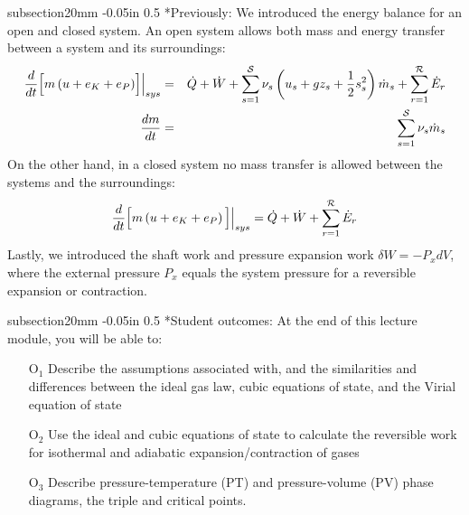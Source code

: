 \documentclass[11pt]{article}
\makeatletter
\theoremstyle{definition}
\renewcommand\subsection{\@startsection
	{subsection}{2}{0mm}
	{-0.05in}
	{0.5\baselineskip}
	{\normalfont\normalsize\bfseries}}
\makeatother
\begin{document}
\begin{mdframed}[backgroundcolor=lgray]
\subsection*{Previously:}
\noindent We introduced the energy balance for an open and closed system.
An open system allows both mass and energy transfer between a system and its surroundings:
\begin{eqnarray*}\label{eqn:general-open-balance}
	\frac{d}{dt}\Bigl[m\left(u+e_{K}+e_{P}\right)\Bigr]\Bigr|_{sys} &=& \dot{Q}+\dot{W}+\sum_{s=1}^{\mathcal{S}}\nu_{s}\left(u_{s}+gz_{s}+\frac{1}{2}s_{s}^{2}\right)\dot{m}_{s}+\sum_{r=1}^{\mathcal{R}}\dot{E}_{r}\\\label{eqn:total-mass-balance}
	\frac{dm}{dt} &=& \sum_{s=1}^{\mathcal{S}}\nu_{s}\dot{m}_{s}
\end{eqnarray*}
On the other hand, in a closed system no mass transfer is allowed between the systems and the surroundings:
\begin{equation*}
  \frac{d}{dt}\Bigr[m\left(u+e_{K}+e_{P}\right)\Bigl]\Bigr|_{sys} = \dot{Q}+\dot{W}+\sum_{r=1}^{\mathcal{R}}\dot{E}_{r}
\end{equation*}
Lastly, we introduced the shaft work and pressure expansion work $\delta{W} = -P_{x}dV$, where the external pressure $P_{x}$ equals the system pressure for a reversible expansion or contraction.

\subsection*{Student outcomes:}
At the end of this lecture module, you will be able to:
\begin{itemize}
  \item[O$_1$]{Describe the assumptions associated with, and the similarities and differences between the ideal gas law, cubic equations of state, and the Virial equation of state}
  \item[O$_2$]{Use the ideal and cubic equations of state to calculate the reversible work for isothermal and adiabatic expansion/contraction of gases}
  \item[O$_3$]{Describe pressure-temperature (PT) and pressure-volume (PV) phase diagrams, the triple and critical points.}
\end{itemize}
\end{mdframed}

\clearpage

\end{document}
